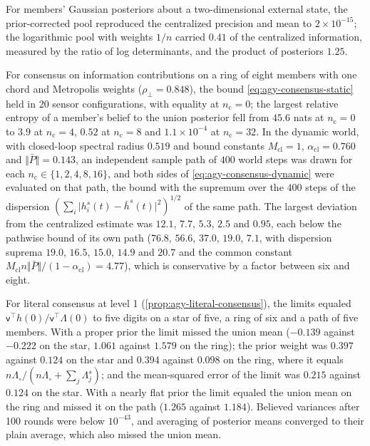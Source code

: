 \begin{numcheck}\label{chk:agy-consensus}
For members' Gaussian posteriors about a two-dimensional external state, the prior-corrected pool reproduced the centralized precision and mean to $2\times10^{-15}$; the logarithmic pool with weights $1/n$ carried $0.41$ of the centralized information, measured by the ratio of log determinants, and the product of posteriors $1.25$.

For consensus on information contributions on a ring of eight members with one chord and Metropolis weights ($\rho_\perp=0.848$), the bound \eqref{eq:agy-consensus-static} held in 20 sensor configurations, with equality at $n_{\mathrm c}=0$; the largest relative entropy of a member's belief to the union posterior fell from $45.6$ nats at $n_{\mathrm c}=0$ to $3.9$ at $n_{\mathrm c}=4$, $0.52$ at $n_{\mathrm c}=8$ and $1.1\times10^{-4}$ at $n_{\mathrm c}=32$. In the dynamic world, with closed-loop spectral radius $0.519$ and bound constants $M_{\mathrm{cl}}=1$, $\alpha_{\mathrm{cl}}=0.760$ and $\Vert\bar P\Vert=0.143$, an independent sample path of $400$ world steps was drawn for each $n_{\mathrm c}\in\{1,2,4,8,16\}$, and both sides of \eqref{eq:agy-consensus-dynamic} were evaluated on that path, the bound with the supremum over the $400$ steps of the dispersion $(\sum_i\lvert h^s_i(t)-\bar h^s(t)\rvert^2)^{1/2}$ of the same path. The largest deviation from the centralized estimate was $12.1$, $7.7$, $5.3$, $2.5$ and $0.95$, each below the pathwise bound of its own path ($76.8$, $56.6$, $37.0$, $19.0$, $7.1$, with dispersion suprema $19.0$, $16.5$, $15.0$, $14.9$ and $20.7$ and the common constant $M_{\mathrm{cl}}n\Vert\bar P\Vert/(1-\alpha_{\mathrm{cl}})=4.77$), which is conservative by a factor between six and eight.

For literal consensus at level 1 (\cref{prop:agy-literal-consensus}), the limits equaled $\mathsf v^\top h(0)/\mathsf v^\top\Lambda(0)$ to five digits on a star of five, a ring of six and a path of five members. With a proper prior the limit missed the union mean ($-0.139$ against $-0.222$ on the star, $1.061$ against $1.579$ on the ring); the prior weight was $0.397$ against $0.124$ on the star and $0.394$ against $0.098$ on the ring, where it equals $n\Lambda_\circ/(n\Lambda_\circ+\sum_j\Lambda^s_j)$; and the mean-squared error of the limit was $0.215$ against $0.124$ on the star. With a nearly flat prior the limit equaled the union mean on the ring and missed it on the path ($1.265$ against $1.184$). Believed variances after 100 rounds were below $10^{-43}$, and averaging of posterior means converged to their plain average, which also missed the union mean.
\end{numcheck}

